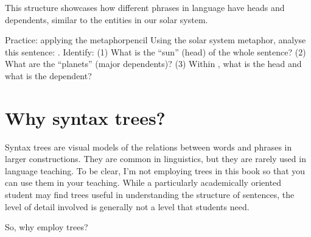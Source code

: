 This structure showcases how different phrases in language have heads and dependents, similar to the entities in our solar system.

\begin{tblsframedsymbol}{Practice: applying the metaphor}{pencil}
Using the solar system metaphor, analyse this sentence: . Identify: (1) What is the \enquote{sun} (head) of the whole sentence? (2) What are the \enquote{planets} (major dependents)? (3) Within , what is the head and what is the dependent?
\end{tblsframedsymbol}

\section{Why syntax trees?} \label{sec:why-trees}

Syntax trees are visual models of the relations between words and phrases in larger constructions. They are common in linguistics, but they are rarely used in language teaching. To be clear, I'm not employing trees in this book so that you can use them in your teaching. While a particularly academically oriented student may find trees useful in understanding the structure of sentences, the level of detail involved is generally not a level that students need.

So, why employ trees?

